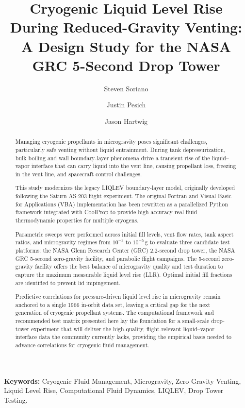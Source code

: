 \documentclass[conf]{new-aiaa}
\title{Cryogenic Liquid Level Rise During Reduced-Gravity Venting: A Design Study for the NASA GRC 5-Second Drop Tower}
\author[1]{Steven Soriano}
\author[2]{Justin Pesich}
\author[2]{Jason Hartwig}
\affil[1]{HX5 and NASA Glenn Research Center, Cleveland, Ohio, USA}
\affil[2]{NASA Glenn Research Center, Cleveland, Ohio, USA}
\begin{document}
\maketitle

\begin{abstract}
Managing cryogenic propellants in microgravity poses significant challenges, particularly safe venting without liquid entrainment. During tank depressurization, bulk boiling and wall boundary-layer phenomena drive a transient rise of the liquid--vapor interface that can carry liquid into the vent line, causing propellant loss, freezing in the vent line, and spacecraft control challenges.

This study modernizes the legacy LIQLEV boundary-layer model, originally developed following the Saturn AS-203 flight experiment. The original Fortran and Visual Basic for Applications (VBA) implementation has been rewritten as a parallelized Python framework integrated with CoolProp to provide high-accuracy real-fluid thermodynamic properties for multiple cryogens.

Parametric sweeps were performed across initial fill levels, vent flow rates, tank aspect ratios, and microgravity regimes from $10^{-3}$ to $10^{-5}\,$g to evaluate three candidate test platforms: the NASA Glenn Research Center (GRC) 2.2-second drop tower, the NASA GRC 5-second zero-gravity facility, and parabolic flight campaigns. The 5-second zero-gravity facility offers the best balance of microgravity quality and test duration to capture the maximum measurable liquid level rise (LLR). Optimal initial fill fractions are identified to prevent lid impingement.

Predictive correlations for pressure-driven liquid level rise in microgravity remain anchored to a single 1966 in-orbit data set, leaving a critical gap for the next generation of cryogenic propellant systems. The computational framework and recommended test matrix presented here lay the foundation for a small-scale drop-tower experiment that will deliver the high-quality, flight-relevant liquid--vapor interface data the community currently lacks, providing the empirical basis needed to advance correlations for cryogenic fluid management.
\end{abstract}

\noindent \textbf{Keywords:} Cryogenic Fluid Management, Microgravity, Zero-Gravity Venting, Liquid Level Rise, Computational Fluid Dynamics, LIQLEV, Drop Tower Testing.
\end{document}
